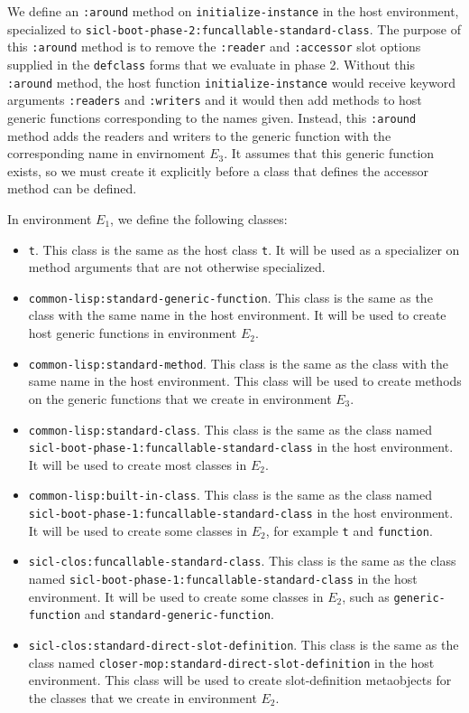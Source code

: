 We define an \texttt{:around} method on \texttt{initialize-instance}
in the host environment, specialized to
\texttt{sicl-boot-phase-2:funcallable-standard-class}.  The purpose of
this \texttt{:around} method is to remove the \texttt{:reader} and
\texttt{:accessor} slot options supplied in the \texttt{defclass}
forms that we evaluate in phase 2.  Without this \texttt{:around}
method, the host function \texttt{initialize-instance} would receive
keyword arguments \texttt{:readers} and \texttt{:writers} and it would
then add methods to host generic functions corresponding to the names
given.  Instead, this \texttt{:around} method adds the readers and
writers to the generic function with the corresponding name in
envirnoment $E_3$.  It assumes that this generic function exists, so
we must create it explicitly before a class that defines the accessor
method can be defined.

In environment $E_1$, we define the following classes:

\begin{itemize}
\item \texttt{t}.  This class is the same as the host class
  \texttt{t}.  It will be used as a specializer on method arguments
  that are not otherwise specialized.
\item \texttt{common-lisp:standard-generic-function}.  This class is
  the same as the class with the same name in the host environment.
  It will be used to create host generic functions in environment
  $E_2$.
\item \texttt{common-lisp:standard-method}.  This class is
  the same as the class with the same name in the host environment.
  This class will be used to create methods on the generic functions
  that we create in environment $E_3$.
\item \texttt{common-lisp:standard-class}.  This class is the same as
  the class named
  \texttt{sicl-boot-phase-1:funcallable-standard-class} in the host
  environment.  It will be used to create most classes in $E_2$.
\item \texttt{common-lisp:built-in-class}.  This class is the same as
  the class named
  \texttt{sicl-boot-phase-1:funcallable-standard-class} in the host
  environment.  It will be used to create some classes in $E_2$, for
  example \texttt{t} and \texttt{function}.
\item \texttt{sicl-clos:funcallable-standard-class}.  This class is
  the same as the class named
  \texttt{sicl-boot-phase-1:funcallable-standard-class} in the host
  environment.  It will be used to create some classes in $E_2$, such
  as \texttt{generic-function} and \texttt{standard-generic-function}.
\item \texttt{sicl-clos:standard-direct-slot-definition}.  This class
  is the same as the class named
  \texttt{closer-mop:standard-direct-slot-definition} in the host
  environment.  This class will be used to create slot-definition
  metaobjects for the classes that we create in environment $E_2$.
\end{itemize}

